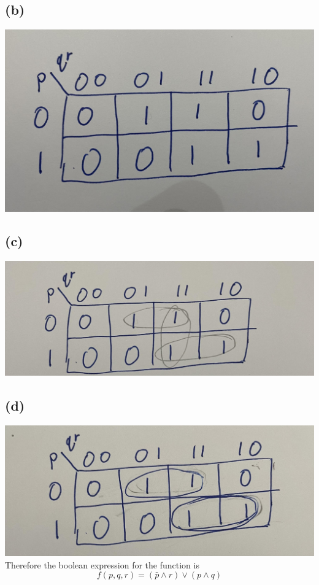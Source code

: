 \documentclass[12pt]{article}
\begin{document}
\subsection*{(b)}
\includegraphics[scale=0.1]{Kmap.jpg}
\subsection*{(c)}
\includegraphics[scale=0.1]{KmapPrime.jpg}
\subsection*{(d)}
\includegraphics[scale=0.1]{KmapFinal.jpg}
Therefore the boolean expression for the function is 
$$f(p,q,r)=\boxed{(\bar{p}\wedge r)\vee(p\wedge q)}$$
\end{document}
